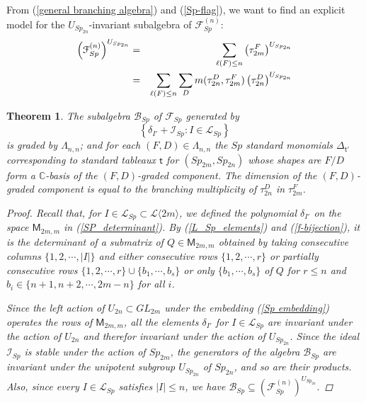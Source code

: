 \documentclass[11pt]{amsart}
\numberwithin{equation}{subsection}
\newtheorem{theorem}{Theorem}[subsection]
\begin{document}
\subsection{}\label{Sp-U-invariants} 

From (\ref{general branching algebra}) and (\ref{Sp-flag}), we want to find an explicit 
model for the $U_{{Sp}_{2n}}$-invariant subalgebra of $\mathcal{F}_{{Sp}}^{(n)}$:
\begin{eqnarray*}
\left( \mathcal{F}_{{Sp}}^{(n)}\right) ^{U_{{Sp}_{2n}}} &=&\sum_{\ell (F)\leq
n}\left( \tau _{2m}^{F}\right) ^{U_{{Sp}_{2n}}}  \\
&=&\sum_{\ell (F)\leq n}\sum_{D}m(\tau _{2n}^{D},\tau _{2m}^{F})\left( \tau
_{2n}^{D}\right) ^{U_{{Sp}_{2n}}}  \notag
\end{eqnarray*}

\begin{theorem}\label{B-Sp_standardmonomialtheory}
The subalgebra $\mathcal{B}_{Sp}$ of $\mathcal{F}_{{Sp}}$ generated by 
$$ \left\{{\delta}_{I'}+ \mathcal{I}_{Sp}: I \in \mathcal{L}_{Sp} \right\}$$ is
graded by $\Lambda _{n,n}$; and for each $(F,D)\in \Lambda _{n,n}$ the
$Sp$ standard monomials ${\Delta}_{\mathsf{t}'}$  
corresponding to standard tableaux $\mathsf{t}$ for $({Sp}_{2m},{Sp}_{2n})$
whose shapes are $F/D$ form a 
$\mathbb{C}$-basis of the $(F,D)$-graded component. The dimension of the 
$(F,D)$-graded component is equal to the branching multiplicity of 
$\tau_{2n}^{D}$ in $\tau _{2m}^{F}$.

\begin{proof}
Recall that, for $I \in \mathcal{L}_{Sp} \subset \mathcal{L}\langle 2m \rangle$, we defined  
the polynomial ${\delta}_{I'}$ on the space $\mathsf{M}_{2m,m}$ in (\ref{SP_determinant}). 
By (\ref{L_Sp_elements}) and (\ref{f-bijection}), it is the determinant of a submatrix of 
$Q \in \mathsf{M}_{2m,m}$
obtained by taking consecutive columns $\{1, 2, \cdots, |I| \}$ and either consecutive rows 
$\{1, 2, \cdots, r \}$ or partially consecutive rows $\{1, 2, \cdots, r \} \cup 
\{b_1, \cdots, b_s \}$ or only $\{b_1, \cdots, b_s \}$ of $Q$ for $r \leq n$ and 
$b_i \in \{n+1, n+2, \cdots, 2m-n \}$ for all $i$.

Since the left action of $U_{2n} \subset GL_{2m} $ under the embedding (\ref{Sp  embedding}) 
operates the rows of $\mathsf{M}_{2m,m}$, all the elements ${\delta}_{I'}$ for $I\in \mathcal{L}_{Sp}$ are
invariant under the action of $U_{2n}$ and therefor invariant under the action of $U_{Sp_{2n}}$.
Since the ideal $\mathcal{I}_{Sp}$ is stable under the action of $Sp_{2m}$, the generators of the
algebra $\mathcal{B}_{Sp}$ are invariant under the unipotent subgroup $U_{Sp_{2n}}$ of $Sp_{2n}$, 
and so are their products. Also, since every $I \in \mathcal{L}_{Sp}$ satisfies $|I| \leq n$, 
we have
$
\mathcal{B}_{Sp} \subseteq \left( \mathcal{F}_{{Sp}}^{(n)}\right) ^{U_{{Sp}_{2n}}}.
$


\end{proof}
\end{theorem}
\end{document}
